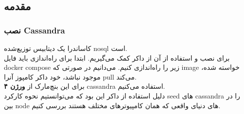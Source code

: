 
\subsection{مقدمه}
\subsubsection{نصب Cassandra}
کاساندرا یک دیتابیس توزیع‌شده nosql است.\\
برای نصب و استفاده از آن از داکر کمک می‌گیریم.
ابتدا برای راه‌اندازی باید فایل 
docker compose 
زیر را راه‌اندازی کنیم. می‌دانیم در صورتی که 
image  
خواسته شده، موجود نباشد، خود داکر کامپوز آنرا
pull 
می‌کند.\\
برای این بنچ‌مارک از \textbf{ورژن ۴} 
cassandra
استفاده می‌کنیم.
\\
دلیل استفاده از داکر این بود که می‌توانستیم نحوه کارکرد 
seed 
های 
cassandra 
را در بین 
node 
های دنیای واقعی که همان کامپیوترهای مختلف هستند بررسی کنیم.


